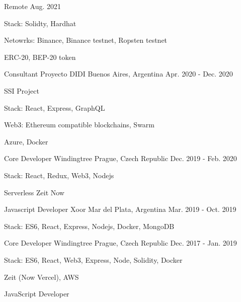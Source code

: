 \begin{cventries}
{Remote} %
{Aug. 2021} %
{ %
\begin{cvitems}
\item {Stack: Solidty, Hardhat}
\item {Netowrks: Binance, Binance testnet, Ropsten testnet}
\item {ERC-20, BEP-20 token}
\end{cvitems}
}
\cventry
{Consultant} %
{Proyecto DIDI} %
{Buenos Aires, Argentina} %
{Apr. 2020 - Dec. 2020} %
{ %
\begin{cvitems}
\item {SSI Project}
\item {Stack: React, Express, GraphQL}
\item {Web3: Ethereum compatible blockchains, Swarm}
\item {Azure, Docker}
\end{cvitems}
}
\cventry
{Core Developer} %
{Windingtree} %
{Prague, Czech Republic} %
{Dec. 2019 - Feb. 2020} %
{ %
\begin{cvitems}
\item {Stack: React, Redux, Web3, Nodejs}
\item {Serverless Zeit Now}
\end{cvitems}
}
\cventry
{Javascript Developer} %
{Xoor} %
{Mar del Plata, Argentina} %
{Mar. 2019 - Oct. 2019} %
{ %
\begin{cvitems}
\item {Stack: ES6, React, Express, Nodejs, Docker, MongoDB}
\end{cvitems}
}
\cventry
{Core Developer} %
{Windingtree} %
{Prague, Czech Republic} %
{Dec. 2017 - Jan. 2019} %
{ %
\begin{cvitems}
\item {Stack: ES6, React, Web3, Express, Node, Solidity, Docker}
\item {Zeit (Now Vercel), AWS}
\end{cvitems}
}
\cventry
{JavaScript Developer} %

\end{cventries}
